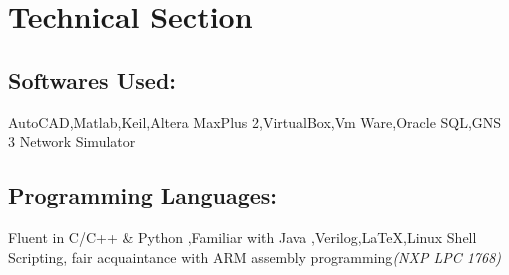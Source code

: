 \documentclass{article}
\begin{document}
\begin{itemize}
\end{itemize}




\section*{Technical Section}
\subsection*{Softwares Used:}
AutoCAD,Matlab,Keil,Altera MaxPlus 2,VirtualBox,Vm Ware,Oracle SQL,GNS 3 Network Simulator
\subsection*{Programming Languages:}
Fluent in C/C++ \& Python ,Familiar with Java ,Verilog,{\LaTeX},Linux Shell Scripting,
fair acquaintance with ARM assembly programming\textit{(NXP LPC 1768)}
\end{document}
